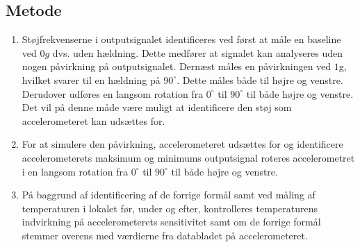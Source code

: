 \subsection{Metode}
\begin{enumerate} [label=\bfseries Formål \arabic*:]
\item Støjfrekvenserne i outputsignalet identificeres ved først at måle en baseline ved $0g$ dvs. uden hældning. Dette medfører at signalet kan analyseres uden nogen påvirkning på outputsignalet. Dernæst måles en påvirkningen ved $1$g, hvilket svarer til en hældning på $90^{\circ}$. Dette måles både til højre og venstre. Derudover udføres en langsom rotation fra $0^{\circ}$ til $90^{\circ}$ til både højre og venstre. Det vil på denne måde være muligt at identificere den støj som accelerometeret kan udsættes for. %
\item For at simulere den påvirkning, accelerometeret udsættes for og identificere accelerometerets maksimum og minimums outputsignal roteres accelerometret i en langsom rotation fra $0^{\circ}$ til $90^{\circ}$ til både højre og venstre.
\item På baggrund af identificering af de forrige formål samt ved måling af temperaturen i lokalet før, under og efter, kontrolleres temperaturens indvirkning på accelerometerets sensitivitet samt om de forrige formål   stemmer overens med værdierne fra databladet på accelerometeret. \cite{Devices2009} 
\end{enumerate}


